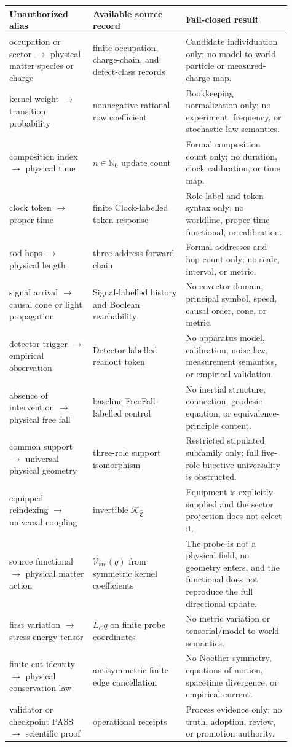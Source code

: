 \documentclass[11pt]{article}
\newcommand{\Src}{\mathrm{src}}
\begin{document}
\begin{longtable}{p{0.27\linewidth}p{0.30\linewidth}p{0.34\linewidth}}
\toprule
Unauthorized alias & Available source record & Fail-closed result\\
\midrule
\endhead
occupation or sector \(\to\) physical matter species or charge &
finite occupation, charge-chain, and defect-class records &
Candidate individuation only; no model-to-world particle or measured-charge
map.\\
kernel weight \(\to\) transition probability &
nonnegative rational row coefficient &
Bookkeeping normalization only; no experiment, frequency, or stochastic-law
semantics.\\
composition index \(\to\) physical time &
\(n\in\mathbb N_0\) update count &
Formal composition count only; no duration, clock calibration, or time map.\\
clock token \(\to\) proper time &
finite Clock-labelled token response &
Role label and token syntax only; no worldline, proper-time functional, or
calibration.\\
rod hops \(\to\) physical length &
three-address forward chain &
Formal addresses and hop count only; no scale, interval, or metric.\\
signal arrival \(\to\) causal cone or light propagation &
Signal-labelled history and Boolean reachability &
No covector domain, principal symbol, speed, causal order, cone, or metric.\\
detector trigger \(\to\) empirical observation &
Detector-labelled readout token &
No apparatus model, calibration, noise law, measurement semantics, or
empirical validation.\\
absence of intervention \(\to\) physical free fall &
baseline FreeFall-labelled control &
No inertial structure, connection, geodesic equation, or equivalence-principle
content.\\
common support \(\to\) universal physical geometry &
three-role support isomorphism &
Restricted stipulated subfamily only; full five-role bijective universality is
obstructed.\\
equipped reindexing \(\to\) universal coupling &
invertible \(\mathcal K_{\widehat{\mathfrak C}}\) &
Equipment is explicitly supplied and the sector projection does not select
it.\\
source functional \(\to\) physical matter action &
\(\mathcal V_{\Src}(q)\) from symmetric kernel coefficients &
The probe is not a physical field, no geometry enters, and the functional
does not reproduce the full directional update.\\
first variation \(\to\) stress-energy tensor &
\(L_Cq\) on finite probe coordinates &
No metric variation or tensorial/model-to-world semantics.\\
finite cut identity \(\to\) physical conservation law &
antisymmetric finite edge cancellation &
No Noether symmetry, equations of motion, spacetime divergence, or empirical
current.\\
validator or checkpoint PASS \(\to\) scientific proof &
operational receipts &
Process evidence only; no truth, adoption, review, or promotion authority.\\
\bottomrule
\end{longtable}
\end{document}
